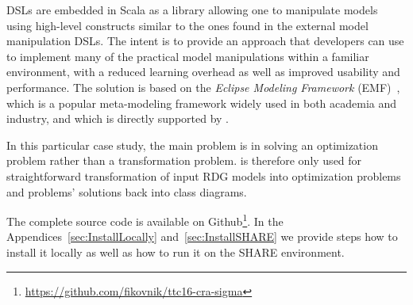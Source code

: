 \SIGMA DSLs are embedded in Scala as a library allowing one to manipulate models using high-level constructs similar to the ones found in the external model manipulation DSLs.
The intent is to provide an approach that developers can use to implement many of the practical model manipulations within a familiar environment, with a reduced learning overhead as well as improved usability and performance.
The solution is based on the \emph{Eclipse Modeling Framework} (EMF)~\cite{EMF}, which is a popular meta-modeling framework widely used in both academia and industry, and which is directly supported by \SIGMA.

In this particular \TTC case study, the main problem is in solving an optimization problem rather than a transformation problem.
\SIGMA is therefore only used for straightforward transformation of input RDG models into optimization problems and problems' solutions back into class diagrams.

The complete source code is available on Github\footnote{\url{https://github.com/fikovnik/ttc16-cra-sigma}}.
In the Appendices~\ref{sec:InstallLocally} and~\ref{sec:InstallSHARE} we provide steps how to install it locally as well as how to run it on the SHARE environment.